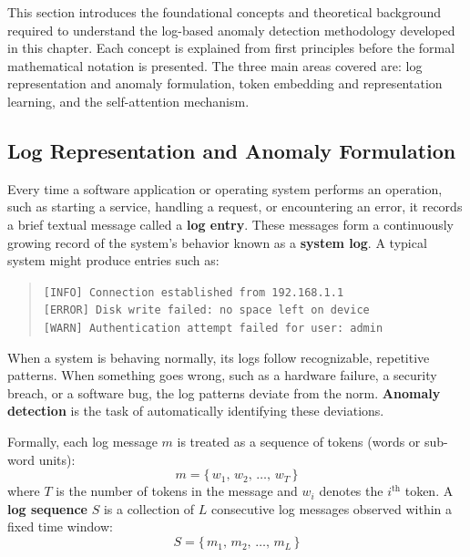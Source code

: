 This section introduces the foundational concepts and theoretical background required to understand the log-based anomaly detection methodology developed in this chapter. Each concept is explained from first principles before the formal mathematical notation is presented. The three main areas covered are: log representation and anomaly formulation, token embedding and representation learning, and the self-attention mechanism.

\subsection{Log Representation and Anomaly Formulation}


Every time a software application or operating system performs an operation, such as starting a service, handling a request, or encountering an error, it records a brief textual message called a \textbf{log entry}. These messages form a continuously growing record of the system's behavior known as a \textbf{system log}. A typical system might produce entries such as:

\begin{quote}
\texttt{[INFO] Connection established from 192.168.1.1} \\
\texttt{[ERROR] Disk write failed: no space left on device} \\
\texttt{[WARN] Authentication attempt failed for user: admin}
\end{quote}

When a system is behaving normally, its logs follow recognizable, repetitive patterns. When something goes wrong, such as a hardware failure, a security breach, or a software bug, the log patterns deviate from the norm. \textbf{Anomaly detection} is the task of automatically identifying these deviations.


Formally, each log message $m$ is treated as a sequence of tokens (words or sub-word units):
\begin{equation}
m = \{\, w_1,\, w_2,\, \dots,\, w_T \,\}
\end{equation}
where $T$ is the number of tokens in the message and $w_i$ denotes the $i^{\text{th}}$ token. A \textbf{log sequence} $S$ is a collection of $L$ consecutive log messages observed within a fixed time window:
\begin{equation}
S = \{\, m_1,\, m_2,\, \dots,\, m_L \,\}
\end{equation}

